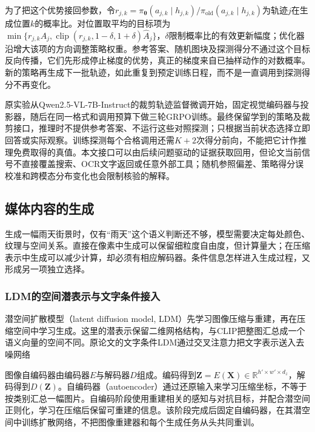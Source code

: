 为了把这个优势接回参数，令$r_{j,k}=\pi_{\bm\theta}(a_{j,k}\mid h_{j,k})/\pi_{\mathrm{old}}(a_{j,k}\mid h_{j,k})$为轨迹$j$在生成位置$k$的概率比。对位置取平均的目标项为$\min\{r_{j,k}\widehat A_j,\operatorname{clip}(r_{j,k},1-\delta,1+\delta)\widehat A_j\}$，$\delta$限制概率比的有效更新幅度；优化器沿增大该项的方向调整策略权重。参考答案、随机图块及探测得分不通过这个目标反向传播，它们先形成停止梯度的优势，真正的梯度来自已抽样动作的对数概率。新的策略再生成下一批轨迹，如此重复到预定训练日程，而不是一直调用到探测得分不再变化。

原实验从Qwen2.5-VL-7B-Instruct的裁剪轨迹监督微调开始，固定视觉编码器与投影器，随后在同一格式和调用预算下做三轮GRPO训练。最终保留学到的策略及裁剪接口，推理时不提供参考答案、不运行这些对照探测；只根据当前状态选择立即回答或实际观察。训练探测每个合格调用还需$K+2$次得分前向，不能把它计作推理免费取得的真值。本文接口可以由后续问题驱动的证据获取回用，但论文当前信号不直接覆盖搜索、OCR文字返回或任意外部工具；随机参照偏差、策略得分误校准和跨模态分布变化也会限制核验的解释。

\subsection{媒体内容的生成}
\label{sec:vision-models-media-generation}

生成一幅雨天街景时，仅有“雨天”这个语义判断还不够，模型需要决定每处颜色、纹理与空间关系。直接在像素中生成可以保留细粒度自由度，但计算量大；在压缩表示中生成可以减少计算，却必须有相应解码器。条件信息怎样进入生成过程，又形成另一项独立选择。

\subsubsection{LDM的空间潜表示与文字条件接入}
\label{sec:vision-models-ldm}

潜空间扩散模型（latent diffusion model, LDM）先学习图像压缩与重建，再在压缩空间中学习生成。这里的潜表示保留二维网格结构，与CLIP把整图汇总成一个语义向量的空间不同。原论文的文字条件LDM通过交叉注意力把文字表示送入去噪网络

图像自编码器由编码器$E$与解码器$D$组成。编码得到$\bm Z=E(\bm X)\in\mathbb R^{h'\times w'\times d_z}$，解码得到$D(\bm Z)$。自编码器（autoencoder）通过还原输入来学习压缩坐标，不等于按类别汇总一幅图片。自编码阶段使用重建相关的感知与对抗目标，并配合潜空间正则化，学习在压缩后保留可重建的信息。该阶段完成后固定自编码器，在其潜空间中训练扩散网络，不把图像重建器和每个生成任务从头共同重训。

